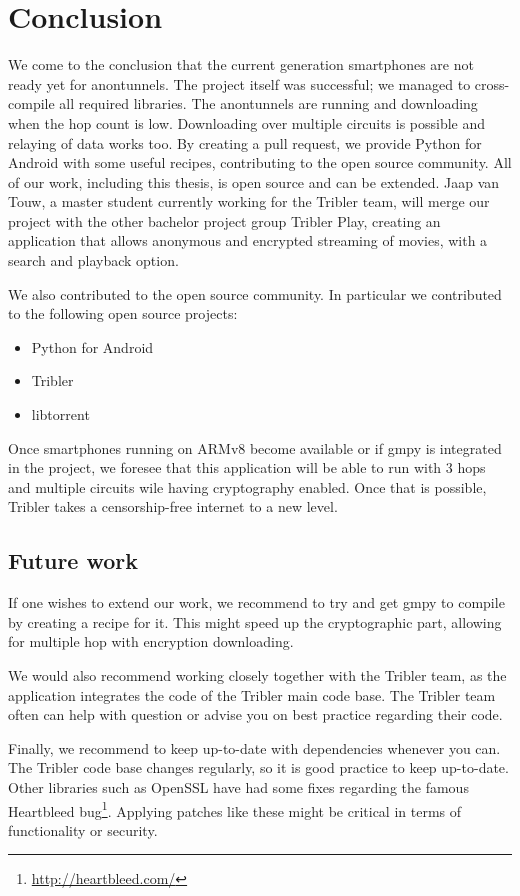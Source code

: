 \chapter{Conclusion}
\label{cpt:conclusion}
	We come to the conclusion that the current generation smartphones are not ready yet for anontunnels. The project itself was successful; we managed to cross-compile all required libraries. The anontunnels are running and downloading when the hop count is low. Downloading over multiple circuits is possible and relaying of data works too. By creating a pull request, we provide Python for Android with some useful recipes, contributing to the open source community. 
	All of our work, including this thesis, is open source and can be extended. Jaap van Touw, a master student currently working for the Tribler team, will merge our project with the other bachelor project group Tribler Play, creating an application that allows anonymous and encrypted streaming of movies, with a search and playback option.
	
	We also contributed to the open source community. In particular we contributed to the following open source projects:
	\begin{itemize}
		\item Python for Android
		\item Tribler
		\item libtorrent
	\end{itemize}
	
	
	Once smartphones running on ARMv8 become available or if gmpy is integrated in the project, we foresee that this application will be able to run with 3 hops and multiple circuits wile having cryptography enabled. Once that is possible, Tribler takes a censorship-free internet to a new level.
	
	\section{Future work}
		If one wishes to extend our work, we recommend to try and get gmpy to compile by creating a recipe for it. This might speed up the cryptographic part, allowing for multiple hop with encryption downloading.
		
		We would also recommend working closely together with the Tribler team, as the application integrates the code of the Tribler main code base. The Tribler team often can help with question or advise you on best practice regarding their code.
		
		Finally, we recommend to keep up-to-date with dependencies whenever you can. The Tribler code base changes regularly, so it is good practice to keep up-to-date. Other libraries such as OpenSSL have had some fixes regarding the famous Heartbleed bug\footnote{\url{http://heartbleed.com/}}. Applying patches like these might be critical in terms of functionality or security.
		
